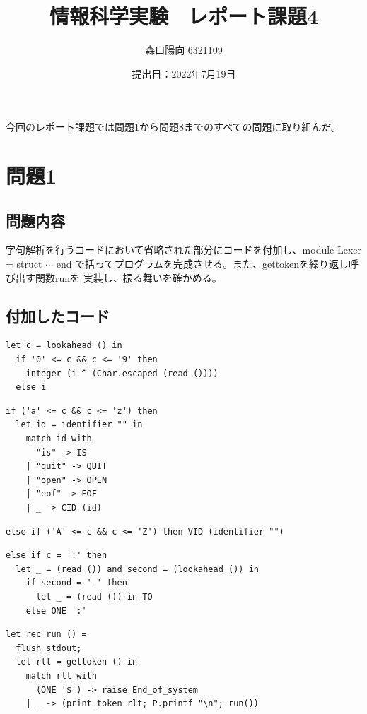 \documentclass{ltjsarticle}
\title{情報科学実験　レポート課題4}
\author{森口陽向  6321109}
\date{提出日：2022年7月19日}
\begin{document}
\maketitle


今回のレポート課題では問題1から問題8までのすべての問題に取り組んだ。

\section{問題1}
\subsection{問題内容}
字句解析を行うコードにおいて省略された部分にコードを付加し、module Lexer = struct $\cdots$ end
で括ってプログラムを完成させる。また、gettokenを繰り返し呼び出す関数runを
実装し、振る舞いを確かめる。

\subsection{付加したコード}
\begin{lstlisting}[caption = (*文字列として数字を構成*)の部分]
  let c = lookahead () in 
  if '0' <= c && c <= '9' then 
    integer (i ^ (Char.escaped (read ())))
  else i
\end{lstlisting}
\begin{lstlisting}[caption = (*CIDに対する識別子および予約語*)の部分]
  if ('a' <= c && c <= 'z') then 
  let id = identifier "" in
    match id with 
      "is" -> IS
    | "quit" -> QUIT
    | "open" -> OPEN
    | "eof" -> EOF
    | _ -> CID (id)
\end{lstlisting}
\begin{lstlisting}[caption = (*VIDに対する識別子*)の部分]
  else if ('A' <= c && c <= 'Z') then VID (identifier "")
\end{lstlisting}
\begin{lstlisting}[caption = (*:-を認識してTOを返す*)の部分]
  else if c = ':' then 
  let _ = (read ()) and second = (lookahead ()) in
    if second = '-' then 
      let _ = (read ()) in TO
    else ONE ':'
\end{lstlisting}
\begin{lstlisting}[caption = 関数runの実装]
  let rec run () =
  flush stdout;
  let rlt = gettoken () in
    match rlt with
      (ONE '$') -> raise End_of_system
    | _ -> (print_token rlt; P.printf "\n"; run())
\end{lstlisting}
\end{document}
